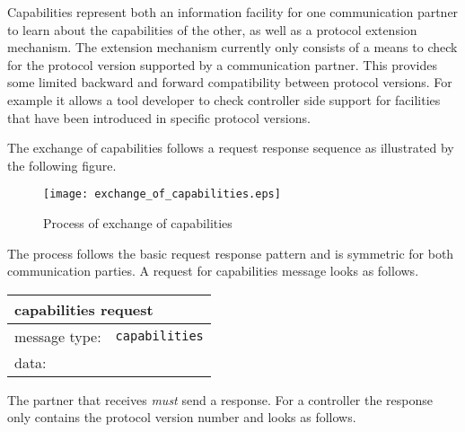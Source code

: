 \documentclass{article}
\newcommand{\msg}[1]{\texttt{#1}}
\begin{document}
   Capabilities represent both an information facility for one communication
   partner to learn about the capabilities of the other, as well as a protocol
   extension mechanism. The extension mechanism currently only consists of a
   means to check for the protocol version supported by a communication
   partner. This provides some limited backward and forward compatibility
   between protocol versions.  For example it allows a tool developer to check
   controller side support for facilities that have been introduced in specific
   protocol versions.
   
   \noindent The exchange of capabilities follows a request response sequence
   as illustrated by the following figure.
   
   \begin{figure}[H]
    \begin{center}
     \texttt{[image: exchange\_of\_capabilities.eps]}
    \end{center}
    \vspace{-0.3cm}
    \caption{Process of exchange of capabilities}
   \end{figure}

   \noindent The process follows the basic request response pattern and is
   symmetric for both communication parties. A request for capabilities
   message looks as follows.
   
   \begin{table}[H]
    \begin{center}
     \begin{tabular}{|ll|}
      \hline
       \multicolumn{2}{|l|}{\textbf{capabilities request}} \\
      \hline
       message type:    & \msg{capabilities} \\
      \hline
       data:            & \\
      \hline
     \end{tabular}
     \vspace{-0.3cm}
    \end{center}
   \end{table}

   \noindent The partner that receives \emph{must} send a response. For a
   controller the response only contains the protocol version number and looks
   as follows.
\end{document}
